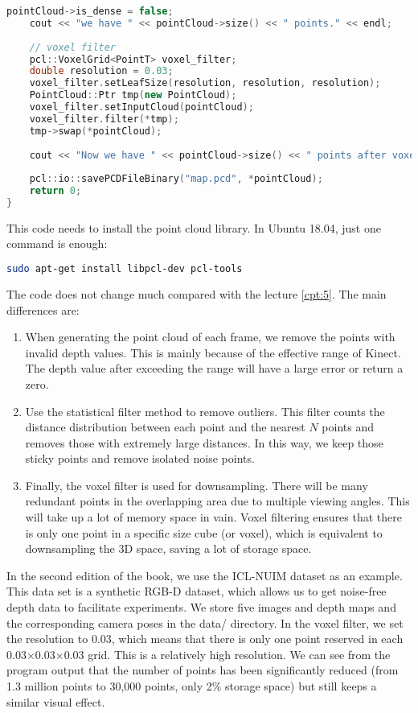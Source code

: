 \begin{lstlisting}[language=c++,caption=slambook/ch12/dense\_RGBD/pointcloud\_mapping.cpp (part)]
	pointCloud->is_dense = false;
	cout << "we have " << pointCloud->size() << " points." << endl;
	
	// voxel filter 
	pcl::VoxelGrid<PointT> voxel_filter;
	double resolution = 0.03;
	voxel_filter.setLeafSize(resolution, resolution, resolution);       // resolution
	PointCloud::Ptr tmp(new PointCloud);
	voxel_filter.setInputCloud(pointCloud);
	voxel_filter.filter(*tmp);
	tmp->swap(*pointCloud);
	
	cout << "Now we have " << pointCloud->size() << " points after voxel filtering." << endl;
	
	pcl::io::savePCDFileBinary("map.pcd", *pointCloud);
	return 0;
}
\end{lstlisting}

This code needs to install the point cloud library. In Ubuntu 18.04, just one command is enough:
\begin{lstlisting}[language=sh, caption=Terminal input:]
sudo apt-get install libpcl-dev pcl-tools
\end{lstlisting}

The code does not change much compared with the lecture \ref{cpt:5}. The main differences are:
\begin{enumerate}
	\item When generating the point cloud of each frame, we remove the points with invalid depth values. This is mainly because of the effective range of Kinect. The depth value after exceeding the range will have a large error or return a zero.
	\item Use the statistical filter method to remove outliers. This filter counts the distance distribution between each point and the nearest $N$ points and removes those with extremely large distances. In this way, we keep those sticky points and remove isolated noise points.
	\item Finally, the voxel filter is used for downsampling. There will be many redundant points in the overlapping area due to multiple viewing angles. This will take up a lot of memory space in vain. Voxel filtering ensures that there is only one point in a specific size cube (or voxel), which is equivalent to downsampling the 3D space, saving a lot of storage space.
\end{enumerate}

In the second edition of the book, we use the ICL-NUIM dataset \cite{Handa2014} as an example. This data set is a synthetic RGB-D dataset, which allows us to get noise-free depth data to facilitate experiments. We store five images and depth maps and the corresponding camera poses in the data/ directory. In the voxel filter, we set the resolution to 0.03, which means that there is only one point reserved in each 0.03$\times$0.03$\times$0.03 grid. This is a relatively high resolution. We can see from the program output that the number of points has been significantly reduced (from 1.3 million points to 30,000 points, only 2$ \%$ storage space) but still keeps a similar visual effect.

